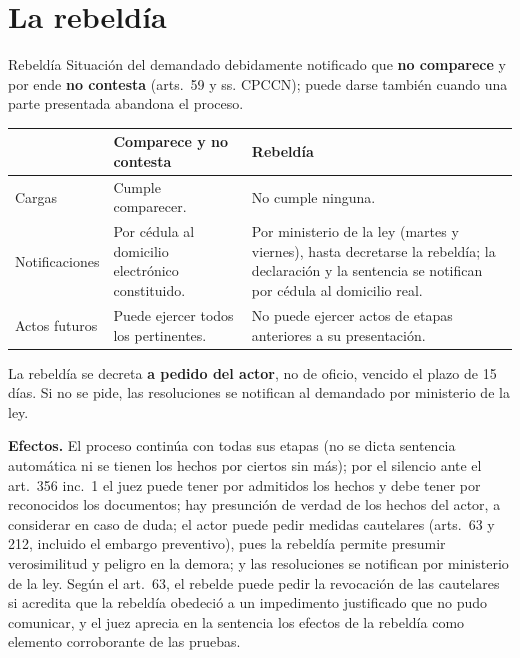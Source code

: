 \documentclass[12pt,oneside]{book}
\renewcommand{\arraystretch}{1.15}
\begin{document}
\section{La rebeldía}

\begin{definition}{Rebeldía}
Situación del demandado debidamente notificado que \textbf{no comparece} y por ende \textbf{no contesta} (arts.~59 y ss. CPCCN); puede darse también cuando una parte presentada abandona el proceso.
\end{definition}

\begin{table}[H]
\centering
\renewcommand{\arraystretch}{1.25}
\begin{tabularx}{\textwidth}{>{\RaggedRight\arraybackslash}p{}>{\RaggedRight\arraybackslash}X>{\RaggedRight\arraybackslash}X}
\toprule
 & \textbf{Comparece y no contesta} & \textbf{Rebeldía} \\
\midrule
Cargas & Cumple comparecer. & No cumple ninguna. \\
Notificaciones & Por cédula al domicilio electrónico constituido. & Por ministerio de la ley (martes y viernes), hasta decretarse la rebeldía; la declaración y la sentencia se notifican por cédula al domicilio real. \\
Actos futuros & Puede ejercer todos los pertinentes. & No puede ejercer actos de etapas anteriores a su presentación. \\
\bottomrule
\end{tabularx}
\end{table}

La rebeldía se decreta \textbf{a pedido del actor}, no de oficio, vencido el plazo de 15 días. Si no se pide, las resoluciones se notifican al demandado por ministerio de la ley. %

\textbf{Efectos.} El proceso continúa con todas sus etapas (no se dicta sentencia automática ni se tienen los hechos por ciertos sin más); por el silencio ante el art.~356 inc.~1 el juez puede tener por admitidos los hechos y debe tener por reconocidos los documentos; hay presunción de verdad de los hechos del actor, a considerar en caso de duda; el actor puede pedir medidas cautelares (arts.~63 y 212, incluido el embargo preventivo), pues la rebeldía permite presumir verosimilitud y peligro en la demora; y las resoluciones se notifican por ministerio de la ley. Según el art.~63, el rebelde puede pedir la revocación de las cautelares si acredita que la rebeldía obedeció a un impedimento justificado que no pudo comunicar, y el juez aprecia en la sentencia los efectos de la rebeldía como elemento corroborante de las pruebas.
\end{document}
